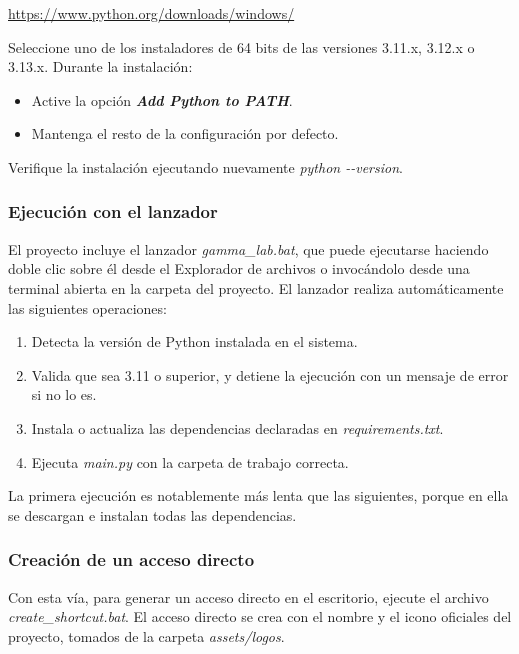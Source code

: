 \documentclass[11pt,a4paper]{article}
\begin{document}
    \begin{center}\url{https://www.python.org/downloads/windows/}\end{center}

    Seleccione uno de los instaladores de 64 bits de las versiones 3.11.x, 3.12.x o 3.13.x. Durante la instalaci\'on:

    \begin{itemize}
        \item Active la opci\'on \textbf{\textit{Add Python to PATH}}.
        \item Mantenga el resto de la configuraci\'on por defecto.
    \end{itemize}

    Verifique la instalaci\'on ejecutando nuevamente \textit{python -{}-version}.

    \subsubsection{Ejecuci\'on con el lanzador}
    El proyecto incluye el lanzador \textit{gamma\_lab.bat}, que puede ejecutarse haciendo doble clic sobre \'el desde el Explorador de archivos o invoc\'andolo desde una terminal abierta en la carpeta del proyecto. El lanzador realiza autom\'aticamente las siguientes operaciones:

    \begin{enumerate}
        \item Detecta la versi\'on de Python instalada en el sistema.
        \item Valida que sea 3.11 o superior, y detiene la ejecuci\'on con un mensaje de error si no lo es.
        \item Instala o actualiza las dependencias declaradas en \textit{requirements.txt}.
        \item Ejecuta \textit{main.py} con la carpeta de trabajo correcta.
    \end{enumerate}

    La primera ejecuci\'on es notablemente m\'as lenta que las siguientes, porque en ella se descargan e instalan todas las dependencias.

    \subsubsection{Creaci\'on de un acceso directo}
    Con esta v\'ia, para generar un acceso directo en el escritorio, ejecute el archivo \textit{create\_shortcut.bat}. El acceso directo se crea con el nombre y el icono oficiales del proyecto, tomados de la carpeta \textit{assets/logos}.
\end{document}
